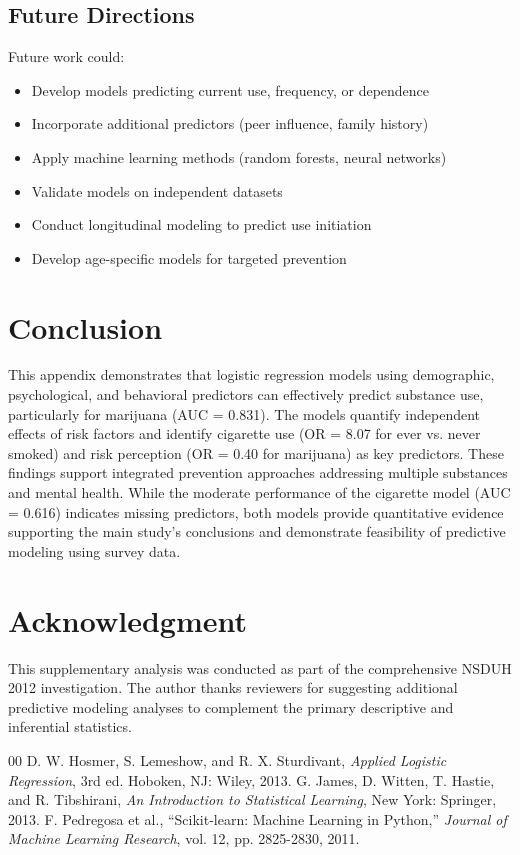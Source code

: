 \documentclass[conference]{IEEEtran}
\begin{document}
\subsection{Future Directions}

Future work could:
\begin{itemize}
    \item Develop models predicting current use, frequency, or dependence
    \item Incorporate additional predictors (peer influence, family history)
    \item Apply machine learning methods (random forests, neural networks)
    \item Validate models on independent datasets
    \item Conduct longitudinal modeling to predict use initiation
    \item Develop age-specific models for targeted prevention
\end{itemize}

\section{Conclusion}

This appendix demonstrates that logistic regression models using demographic, psychological, and behavioral predictors can effectively predict substance use, particularly for marijuana (AUC = 0.831). The models quantify independent effects of risk factors and identify cigarette use (OR = 8.07 for ever vs. never smoked) and risk perception (OR = 0.40 for marijuana) as key predictors. These findings support integrated prevention approaches addressing multiple substances and mental health. While the moderate performance of the cigarette model (AUC = 0.616) indicates missing predictors, both models provide quantitative evidence supporting the main study's conclusions and demonstrate feasibility of predictive modeling using survey data.

\section*{Acknowledgment}

This supplementary analysis was conducted as part of the comprehensive NSDUH 2012 investigation. The author thanks reviewers for suggesting additional predictive modeling analyses to complement the primary descriptive and inferential statistics.

\begin{thebibliography}{00}
 D. W. Hosmer, S. Lemeshow, and R. X. Sturdivant, \textit{Applied Logistic Regression}, 3rd ed. Hoboken, NJ: Wiley, 2013.
 G. James, D. Witten, T. Hastie, and R. Tibshirani, \textit{An Introduction to Statistical Learning}, New York: Springer, 2013.
 F. Pedregosa et al., ``Scikit-learn: Machine Learning in Python,'' \textit{Journal of Machine Learning Research}, vol. 12, pp. 2825-2830, 2011.
\end{thebibliography}
\end{document}
